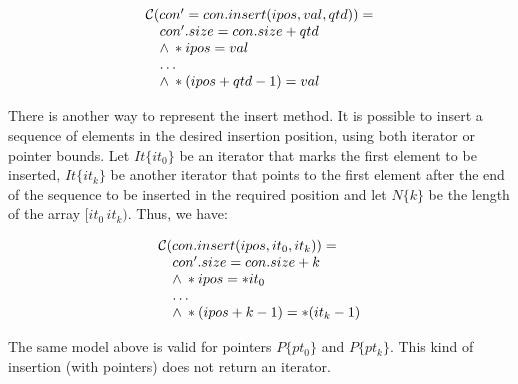 \documentclass[conference]{IEEEtran}
\begin{document}
\[\begin{array}{ll}
\multicolumn{2}{l}{{\cal C}(con'=con.insert(ipos, val, qtd))=}\\
  &  con'.size = con.size + qtd\\
  & \wedge \: *ipos = val \\
  & \ldots \\
  & \wedge \: *(ipos + qtd - 1) = val \\
\end{array}\]

There is another way to represent the insert method.
It is possible to insert a sequence of elements in the desired
insertion position, using both iterator or pointer bounds.
Let $It\{it_0\}$ be an iterator that marks the first element
to be inserted, $It\{it_k\}$ be another iterator that
points to the first element after the end of the sequence to be inserted
in the required position and let $N\{k\}$ be the length of the array $[it_0\, it_k)$.
Thus, we have:

\[\begin{array}{ll}
\multicolumn{2}{l}{{\cal C}(con.insert(ipos, it_0, it_k))=}\\
  & con'.size = con.size + k\\
  & \wedge \: *ipos = *it_0 \\
  & \ldots \\
  & \wedge \: *(ipos + k - 1) = *(it_k - 1) \\
\end{array}\]

The same model above is valid for pointers $P\{pt_0\}$ and $P\{pt_k\}$.
This kind of insertion (with pointers) does not return an iterator.
\end{document}
